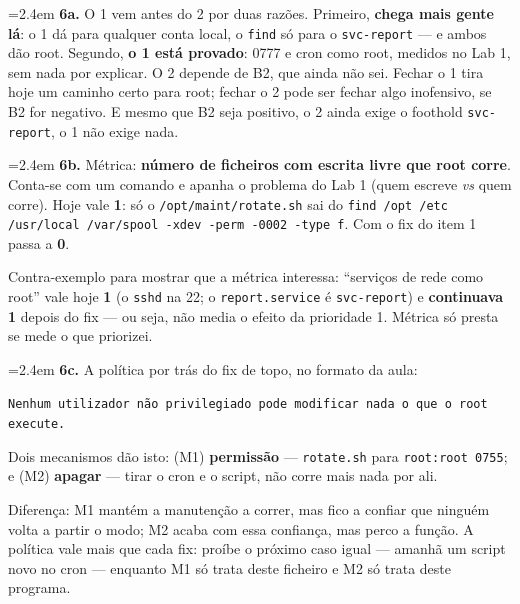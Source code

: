 \documentclass[a4paper,11pt]{article}
\newenvironment{answer}[1]{%
  \par\addvspace{7pt}\noindent
  \hangindent=2.4em\hangafter=1
  {\color{sscnblue}\bfseries #1\hspace{0.55em}}\ignorespaces}
  {\par\addvspace{5pt}}
\newcommand{\cmd}[1]{\textcolor{sscnblue}{\texttt{#1}}}
\begin{document}
\begin{answer}{6a.}
O 1 vem antes do 2 por duas raz\~oes. Primeiro, \textbf{chega mais gente l\'a}: o 1
d\'a para qualquer conta local, o \cmd{find} s\'o para o \cmd{svc-report} --- e ambos
d\~ao root. Segundo, \textbf{o 1 est\'a provado}: 0777 e cron como root, medidos no
Lab 1, sem nada por explicar. O 2 depende de B2, que ainda n\~ao sei. Fechar o 1
tira hoje um caminho certo para root; fechar o 2 pode ser fechar algo inofensivo,
se B2 for negativo. E mesmo que B2 seja positivo, o 2 ainda exige o foothold
\texttt{svc-report}, o 1 n\~ao exige nada.
\end{answer}

\begin{answer}{6b.}
M\'etrica: \textbf{n\'umero de ficheiros com escrita livre que root corre}. Conta-se
com um comando e apanha o problema do Lab 1 (quem escreve \emph{vs} quem corre).
Hoje vale \textbf{1}: s\'o o \cmd{/opt/maint/rotate.sh} sai do
\cmd{find /opt /etc /usr/local /var/spool -xdev -perm -0002 -type f}. Com o fix do
item 1 passa a \textbf{0}.

Contra-exemplo para mostrar que a m\'etrica interessa: ``servi\c{c}os de rede como
root'' vale hoje \textbf{1} (o \cmd{sshd} na 22; o \texttt{report.service} \'e
\texttt{svc-report}) e \textbf{continuava 1} depois do fix --- ou seja, n\~ao media
o efeito da prioridade 1. M\'etrica s\'o presta se mede o que priorizei.
\end{answer}

\begin{answer}{6c.}
A pol\'itica por tr\'as do fix de topo, no formato da aula:

\begin{center}
\cmd{Nenhum utilizador n\~{a}o privilegiado pode modificar nada o que o root execute.}
\end{center}

Dois mecanismos d\~ao isto: (M1) \textbf{permiss\~ao} --- \cmd{rotate.sh} para
\cmd{root:root 0755}; e (M2) \textbf{apagar} --- tirar o cron e o script, n\~ao corre
mais nada por ali.

Diferen\c{c}a: M1 mant\'em a manuten\c{c}\~ao a correr, mas fico a confiar que ningu\'em
volta a partir o modo; M2 acaba com essa confian\c{c}a, mas perco a fun\c{c}\~ao. A
pol\'itica vale mais que cada fix: pro\'ibe o pr\'oximo caso igual --- amanh\~a um
script novo no cron --- enquanto M1 s\'o trata deste ficheiro e M2 s\'o trata deste
programa.
\end{answer}
\end{document}
